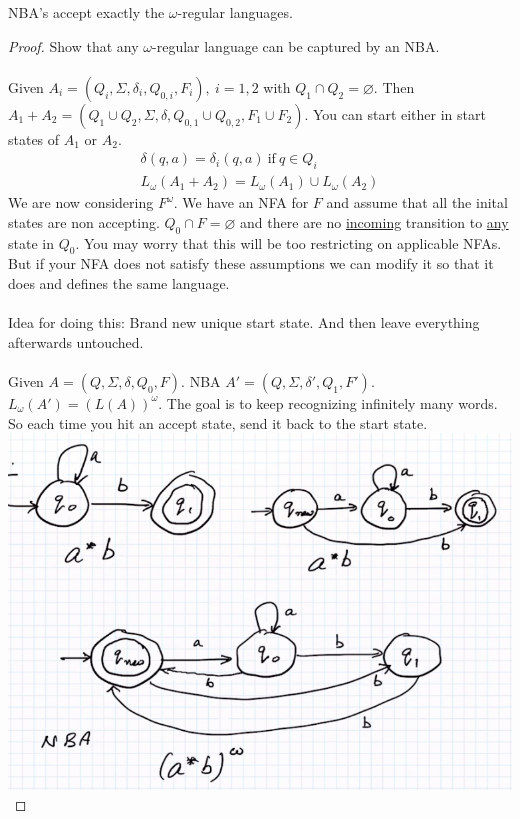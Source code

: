 \documentclass[../598comp.tex]{subfiles}
\begin{document}
\begin{theorem}
  NBA's accept exactly the $\omega$-regular languages.
  \begin{proof}
    Show that any $\omega$-regular language can be captured by an NBA.
    \\\\
    Given $A_i = (Q_i, \Sigma, \delta_i, Q_{0, i}, F_i), \ i = 1, 2$ with $Q_1
    \cap Q_2 = \varnothing$. Then $A_1 + A_2 = (Q_1 \cup Q_2, \Sigma, \delta,
    Q_{0, 1} \cup Q_{0, 2}, F_1 \cup F_2)$. You can start either in start states
    of $A_1$ or $A_2$.
    \begin{gather*}
      \delta(q, a) = \delta_i(q, a) \ \text{if} \ q \in Q_i \\
      L_\omega (A_1 + A_2) = L_\omega(A_1) \cup L_\omega(A_2)
    \end{gather*}
    We are now considering $F^\omega$. We have an NFA for $F$ and assume that
    all the inital states are non accepting. $Q_0 \cap F = \varnothing$ and
    there are no \ul{incoming} transition to \ul{any} state in $Q_0$. You may
    worry that this will be too restricting on applicable NFAs. But if your
    NFA does not satisfy these assumptions we can modify it so that it does and
    defines the same language.
    \\\\
    Idea for doing this: Brand new unique start state. And then leave everything
    afterwards untouched.
    \\\\
    Given $A = (Q, \Sigma, \delta, Q_0, F)$. NBA $A' = (Q, \Sigma, \delta', Q_1,
    F')$. $L_\omega(A') = (L(A))^\omega$.
    The goal is to keep recognizing infinitely many words. So each time you hit
    an accept state, send it back to the start state.
    \\
    \includegraphics[width=\textwidth]{nfa_to_nba_example.png}

\end{proof}
\end{theorem}
\end{document}
